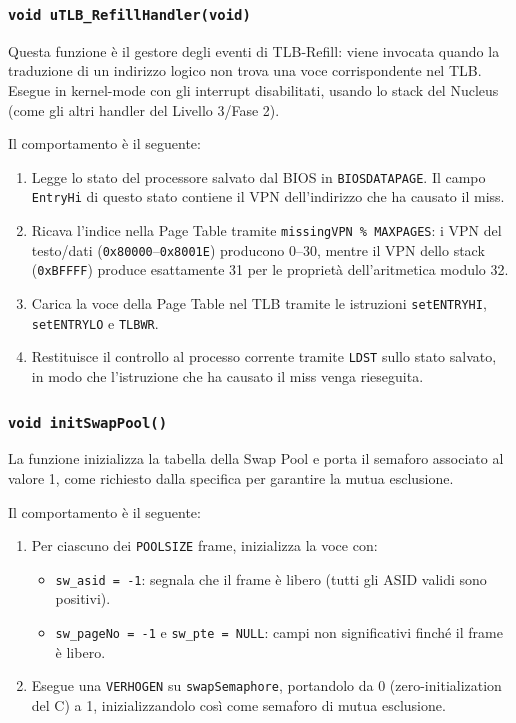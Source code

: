 \documentclass[a4paper,12pt]{article}
\begin{document}
\subsubsection{\texttt{void uTLB\_RefillHandler(void)}}

Questa funzione è il gestore degli eventi di TLB-Refill: viene invocata quando la traduzione di un indirizzo logico non trova una voce corrispondente nel TLB. Esegue in kernel-mode con gli interrupt disabilitati, usando lo stack del Nucleus (come gli altri handler del Livello 3/Fase 2).

Il comportamento è il seguente:

\begin{enumerate}
    \item Legge lo stato del processore salvato dal BIOS in \texttt{BIOSDATAPAGE}. Il campo \texttt{EntryHi} di questo stato contiene il VPN dell'indirizzo che ha causato il miss.
    \item Ricava l'indice nella Page Table tramite \texttt{missingVPN \% MAXPAGES}:
    i VPN del testo/dati (\texttt{0x80000}--\texttt{0x8001E}) producono 0--30, mentre
    il VPN dello stack (\texttt{0xBFFFF}) produce esattamente 31 per le proprietà
    dell'aritmetica modulo 32.
    \item Carica la voce della Page Table nel TLB tramite le istruzioni \texttt{setENTRYHI}, \texttt{setENTRYLO} e \texttt{TLBWR}.
    \item Restituisce il controllo al processo corrente tramite \texttt{LDST} sullo stato salvato, in modo che l'istruzione che ha causato il miss venga rieseguita.
\end{enumerate}

\subsubsection{\texttt{void initSwapPool()}}

La funzione inizializza la tabella della Swap Pool e porta il semaforo associato al valore 1, come richiesto dalla specifica per garantire la mutua esclusione.

Il comportamento è il seguente:

\begin{enumerate}
    \item Per ciascuno dei \texttt{POOLSIZE} frame, inizializza la voce con:
    \begin{itemize}
        \item \texttt{sw\_asid = -1}: segnala che il frame è libero (tutti gli ASID validi sono positivi).
        \item \texttt{sw\_pageNo = -1} e \texttt{sw\_pte = NULL}: campi non significativi finché il frame è libero.
    \end{itemize}
    \item Esegue una \texttt{VERHOGEN} su \texttt{swapSemaphore}, portandolo da 0 (zero-initialization del C) a 1, inizializzandolo così come semaforo di mutua esclusione.
\end{enumerate}
\end{document}
